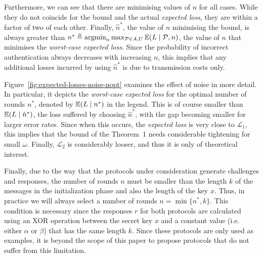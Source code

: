 \documentclass[a4paper]{article}
\newcommand \defn {\mathrel{\triangleq}}
\newcommand \ELb {\mathcal{L}}
\newcommand\E{\mathop{\mbox{\ensuremath{\mathbb{E}}}}\nolimits}
\newcommand\argmin{\mathop{\mathrm{argmin}}}
\newcommand \hns {\hat{n}^*}
\newcommand \ns {n^*}
\newcommand \noise {\omega}
\newcommand \loss {L}
\newcommand \auth {\mathcal{P}}
\theoremstyle{plain} \newtheorem{remark}{Remark}
\theoremstyle{plain} \newtheorem{definition}{Definition}
\theoremstyle{plain} \newtheorem{example}{Example}
\theoremstyle{plain} \newtheorem{assumption}{Assumption}
\theoremstyle{plain} \newtheorem{conjecture}{Conjecture}
\theoremstyle{plain} \newtheorem{theorem}{Theorem}
\theoremstyle{plain} \newtheorem{proposition}{Proposition}
\theoremstyle{plain} \newtheorem{lemma}{Lemma}
\theoremstyle{plain} \newtheorem{corollary}{Corollary}
\begin{document}
Furthermore, we can see that there are minimising values of $n$ for
all cases. While they do not coincide for the bound and the actual
\textit{expected loss}, they are within a factor of two of each
other. Finally, $\hns$, the value of $n$ minimising the bound, is
always greater than $\ns \defn \argmin_n \max_{\auth \in A, U} \E
(\loss \mid \auth, n)$, the value of $n$ that minimises the {\em
  worst-case expected loss}.  Since the probability of incorrect
authentication always decreases with increasing $n$, this implies that
any additional losses incurred by using $\hns$ is due to transmission
costs only.

Figure~\ref{fig:expected-losses-noise-nopt}
examines the effect of noise in more detail.  In particular,
it depicts the \textit{worst-case expected loss} for the optimal number of
rounds $\ns$, denoted by $\E (\loss \mid \ns)$ in the legend.  This is
of course smaller than $\E (\loss \mid \hns)$, the loss suffered by
choosing $\hns$, with the gap becoming smaller for larger error
rates. Since when this occurs, the \textit{expected loss} is very close to
$\ELb_1$, this implies that the bound of the Theorem~1 needs considerable
tightening for small $\noise$. Finally, $\ELb_2$ is considerably
looser, and thus it is only of theoretical interest.


Finally, due to the way that the protocols under consideration
generate challenges and responses, the number of rounds $n$ must be
smaller than the length $k$ of the messages in the initialization
phase and also the length of the key $x$.  Thus, in practice we will
always select a number of rounds $n = \min \{ n^*, k\}$.  This
condition is necessary since the responses $r$ for both protocols are
calculated using an XOR operation between the secret key $x$ and a
constant value (i.e. either $\alpha$ or $\beta$) that has the same
length $k$. Since these protocols are only used as examples, it is
beyond the scope of this paper to propose protocols that do not suffer
from this limitation.
\end{document}
